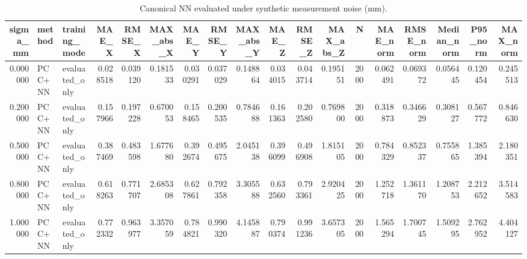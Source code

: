 \begin{table}
\caption{Canonical NN evaluated under synthetic measurement noise (mm).}
\label{tab:summer_noise}
\begin{tabular}{rllrrrrrrrrrrrrrrr}
\toprule
sigma_mm & method & training_mode & MAE_X & RMSE_X & MAX_abs_X & MAE_Y & RMSE_Y & MAX_abs_Y & MAE_Z & RMSE_Z & MAX_abs_Z & N & MAE_norm & RMSE_norm & Median_norm & P95_norm & MAX_norm \\
\midrule
0.000000 & PCC+NN & evaluated_only & 0.028518 & 0.039120 & 0.181533 & 0.030291 & 0.037029 & 0.148864 & 0.034015 & 0.043714 & 0.195151 & 2000 & 0.062491 & 0.069372 & 0.056445 & 0.120454 & 0.245513 \\
0.200000 & PCC+NN & evaluated_only & 0.157966 & 0.197228 & 0.670053 & 0.158465 & 0.200535 & 0.784688 & 0.161363 & 0.202580 & 0.769800 & 2000 & 0.318873 & 0.346629 & 0.308127 & 0.567772 & 0.846630 \\
0.500000 & PCC+NN & evaluated_only & 0.387469 & 0.483598 & 1.677680 & 0.392674 & 0.495675 & 2.045138 & 0.396099 & 0.496908 & 1.815105 & 2000 & 0.784329 & 0.852337 & 0.755865 & 1.385394 & 2.180351 \\
0.800000 & PCC+NN & evaluated_only & 0.618263 & 0.771707 & 2.685308 & 0.627861 & 0.792358 & 3.305588 & 0.632560 & 0.793361 & 2.920425 & 2000 & 1.252718 & 1.361170 & 1.208753 & 2.212652 & 3.514583 \\
1.000000 & PCC+NN & evaluated_only & 0.772332 & 0.963977 & 3.357059 & 0.784821 & 0.990320 & 4.145887 & 0.790374 & 0.991236 & 3.657305 & 2000 & 1.565294 & 1.700745 & 1.509295 & 2.762952 & 4.404127 \\
\bottomrule
\end{tabular}
\end{table}
